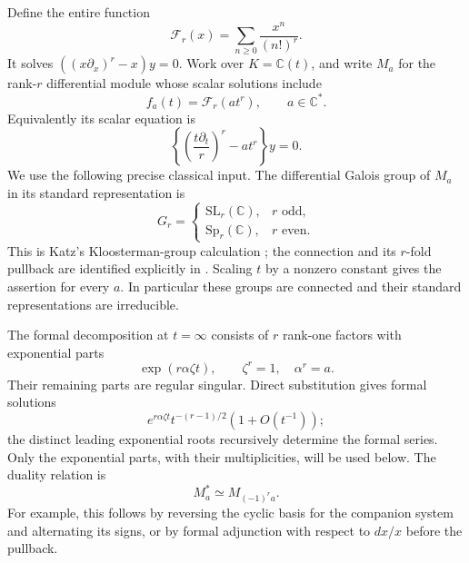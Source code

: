 \documentclass[11pt,a4paper]{article}
\theoremstyle{definition}
\theoremstyle{remark}
\numberwithin{equation}{section}
\begin{document}
Define the entire function
\[
 \mathcal F_r(x)=\sum_{n\ge0}\frac{x^n}{(n!)^r}.
\]
It solves $((x\partial_x)^r-x)y=0$. Work over $K=\mathbb C(t)$,
and write $M_a$ for the rank-$r$ differential module whose scalar
solutions include
\[
 f_a(t)=\mathcal F_r(a t^r),\qquad a\in\mathbb C^*.
\]
Equivalently its scalar equation is
\[
 \left\{\left(\frac{t\partial_t}{r}\right)^r-a t^r\right\}y=0.
\]
We use the following precise classical input. The differential Galois
group of $M_a$ in its standard representation is
\begin{equation}\label{E:ac:katz}
 G_r=\begin{cases}\mathrm{SL}_r(\mathbb C),&r\text{ odd},\\
                    \mathrm{Sp}_r(\mathbb C),&r\text{ even}.
       \end{cases}
\end{equation}
This is Katz's Kloosterman-group calculation
\cite[Corollary 4.4.8]{AC_Katz}; the connection and its $r$-fold
pullback are identified explicitly in
\cite[Proposition 2.4 and the proof of Proposition 2.7]{AC_FSY}.
Scaling $t$ by a nonzero constant gives the assertion for every $a$.
In particular these groups are connected and their standard
representations are irreducible.

The formal decomposition at $t=\infty$ consists of $r$ rank-one
factors with exponential parts
\begin{equation}\label{E:ac:exp}
 \exp(r\alpha\zeta t),\qquad \zeta^r=1,\quad\alpha^r=a.
\end{equation}
Their remaining parts are regular singular. Direct substitution gives
formal solutions
\[e^{r\alpha\zeta t}t^{-(r-1)/2}(1+O(t^{-1}));\]
the distinct leading exponential roots recursively determine the
formal series. Only the exponential parts, with their multiplicities,
will be used below. The duality relation is
\begin{equation}\label{E:ac:dual}
 M_a^*\simeq M_{(-1)^r a}.
\end{equation}
For example, this follows by reversing the cyclic basis for the
companion system and alternating its signs, or by formal adjunction
with respect to $dx/x$ before the pullback.
\end{document}

